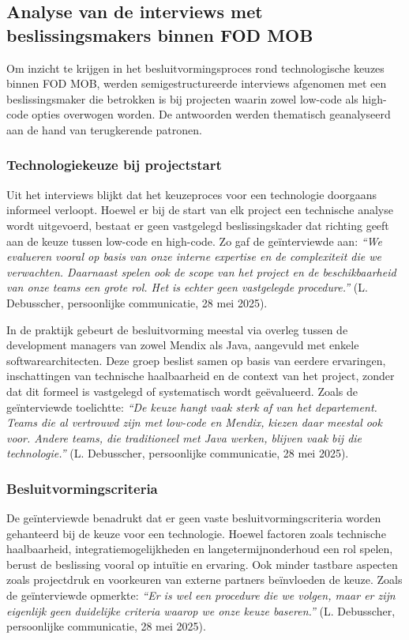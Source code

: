 \subsection{Analyse van de interviews met beslissingsmakers binnen \gls{FOD MOB}}

Om inzicht te krijgen in het besluitvormingsproces rond technologische keuzes binnen \gls{FOD MOB}, werden semigestructureerde interviews afgenomen met een beslissingsmaker die betrokken is bij projecten waarin zowel low-code als high-code opties overwogen worden. De antwoorden werden thematisch geanalyseerd aan de hand van terugkerende patronen.

\subsubsection{Technologiekeuze bij projectstart}

Uit het interviews blijkt dat het keuzeproces voor een technologie doorgaans informeel verloopt. Hoewel er bij de start van elk project een technische analyse wordt uitgevoerd, bestaat er geen vastgelegd beslissingskader dat richting geeft aan de keuze tussen low-code en high-code. Zo gaf de geïnterviewde aan: \textit{“We evalueren vooral op basis van onze interne expertise en de complexiteit die we verwachten. Daarnaast spelen ook de scope van het project en de beschikbaarheid van onze teams een grote rol. Het is echter geen vastgelegde procedure.”} (L. Debusscher, persoonlijke communicatie, 28 mei 2025).

In de praktijk gebeurt de besluitvorming meestal via overleg tussen de development managers van zowel Mendix als Java, aangevuld met enkele softwarearchitecten. Deze groep beslist samen op basis van eerdere ervaringen, inschattingen van technische haalbaarheid en de context van het project, zonder dat dit formeel is vastgelegd of systematisch wordt geëvalueerd. Zoals de geïnterviewde toelichtte: \textit{“De keuze hangt vaak sterk af van het departement. Teams die al vertrouwd zijn met low-code en Mendix, kiezen daar meestal ook voor. Andere teams, die traditioneel met Java werken, blijven vaak bij die technologie.”} (L. Debusscher, persoonlijke communicatie, 28 mei 2025).

\subsubsection{Besluitvormingscriteria}

De geïnterviewde benadrukt dat er geen vaste besluitvormingscriteria worden gehanteerd bij de keuze voor een technologie. Hoewel factoren zoals technische haalbaarheid, integratiemogelijkheden en langetermijnonderhoud een rol spelen, berust de beslissing vooral op intuïtie en ervaring. Ook minder tastbare aspecten zoals projectdruk en voorkeuren van externe partners beïnvloeden de keuze. Zoals de geïnterviewde opmerkte: \textit{“Er is wel een procedure die we volgen, maar er zijn eigenlijk geen duidelijke criteria waarop we onze keuze baseren.”} (L. Debusscher, persoonlijke communicatie, 28 mei 2025).

